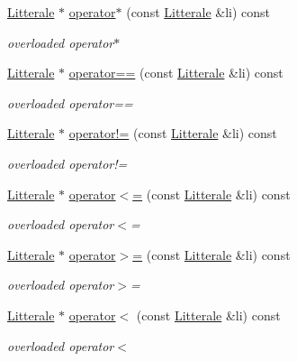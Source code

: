 \begin{DoxyCompactItemize}
\hyperlink{class_litterale}{Litterale} $\ast$ \hyperlink{class_li_rationnelle_a32577e06c8316232a45147b36d9cde06}{operator$\ast$} (const \hyperlink{class_litterale}{Litterale} \&li) const 
\begin{DoxyCompactList}\small\item\em overloaded operator$\ast$ \end{DoxyCompactList}\item 
\hyperlink{class_litterale}{Litterale} $\ast$ \hyperlink{class_li_rationnelle_a27349b75404a5b881da73f5a7362a6a8}{operator==} (const \hyperlink{class_litterale}{Litterale} \&li) const 
\begin{DoxyCompactList}\small\item\em overloaded operator== \end{DoxyCompactList}\item 
\hyperlink{class_litterale}{Litterale} $\ast$ \hyperlink{class_li_rationnelle_a6c9e22c2e191a15a334377b1feb0c8ef}{operator!=} (const \hyperlink{class_litterale}{Litterale} \&li) const 
\begin{DoxyCompactList}\small\item\em overloaded operator!= \end{DoxyCompactList}\item 
\hyperlink{class_litterale}{Litterale} $\ast$ \hyperlink{class_li_rationnelle_a74044fa6f0d605d5bd9c806b14f34391}{operator$<$=} (const \hyperlink{class_litterale}{Litterale} \&li) const 
\begin{DoxyCompactList}\small\item\em overloaded operator$<$= \end{DoxyCompactList}\item 
\hyperlink{class_litterale}{Litterale} $\ast$ \hyperlink{class_li_rationnelle_a40b97ae950c490bde9f0325dbdfb268d}{operator$>$=} (const \hyperlink{class_litterale}{Litterale} \&li) const 
\begin{DoxyCompactList}\small\item\em overloaded operator$>$= \end{DoxyCompactList}\item 
\hyperlink{class_litterale}{Litterale} $\ast$ \hyperlink{class_li_rationnelle_a7750712cfefeb74693b9d7e0c9db40e6}{operator$<$} (const \hyperlink{class_litterale}{Litterale} \&li) const 
\begin{DoxyCompactList}\small\item\em overloaded operator$<$ \end{DoxyCompactList}\item 

\end{DoxyCompactItemize}
